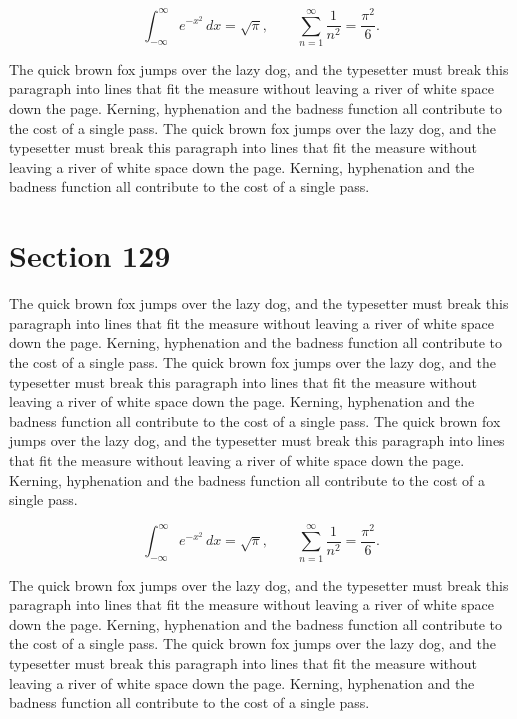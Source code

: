 \documentclass{article}
\begin{document}
\begin{equation}
\int_{-\infty}^{\infty} e^{-x^{2}}\,dx = \sqrt{\pi}, \qquad
\sum_{n=1}^{\infty} \frac{1}{n^{2}} = \frac{\pi^{2}}{6}.
\end{equation}

The quick brown fox jumps over the lazy dog, and the typesetter must break this paragraph into lines that fit the measure without leaving a river of white space down the page. Kerning, hyphenation and the badness function all contribute to the cost of a single pass. The quick brown fox jumps over the lazy dog, and the typesetter must break this paragraph into lines that fit the measure without leaving a river of white space down the page. Kerning, hyphenation and the badness function all contribute to the cost of a single pass. 
\section{Section 129}
The quick brown fox jumps over the lazy dog, and the typesetter must break this paragraph into lines that fit the measure without leaving a river of white space down the page. Kerning, hyphenation and the badness function all contribute to the cost of a single pass. The quick brown fox jumps over the lazy dog, and the typesetter must break this paragraph into lines that fit the measure without leaving a river of white space down the page. Kerning, hyphenation and the badness function all contribute to the cost of a single pass. The quick brown fox jumps over the lazy dog, and the typesetter must break this paragraph into lines that fit the measure without leaving a river of white space down the page. Kerning, hyphenation and the badness function all contribute to the cost of a single pass. 

\begin{equation}
\int_{-\infty}^{\infty} e^{-x^{2}}\,dx = \sqrt{\pi}, \qquad
\sum_{n=1}^{\infty} \frac{1}{n^{2}} = \frac{\pi^{2}}{6}.
\end{equation}

The quick brown fox jumps over the lazy dog, and the typesetter must break this paragraph into lines that fit the measure without leaving a river of white space down the page. Kerning, hyphenation and the badness function all contribute to the cost of a single pass. The quick brown fox jumps over the lazy dog, and the typesetter must break this paragraph into lines that fit the measure without leaving a river of white space down the page. Kerning, hyphenation and the badness function all contribute to the cost of a single pass. 
\end{document}
